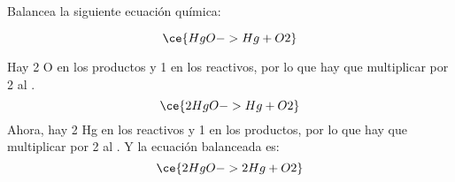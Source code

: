 Balancea la siguiente ecuación química:

\[\ce{HgO -> Hg + O2}\]

\begin{solutionbox}{4.5cm}
    Hay 2 O en los productos y 1 en los reactivos, por lo que hay que multiplicar por 2 al .
    \[ \ce{2HgO -> Hg + O2}\]
    Ahora, hay 2 Hg en los reactivos y 1 en los productos, por lo que hay que multiplicar por 2 al . Y la ecuación balanceada es:
    \[ \ce{2HgO -> 2Hg + O2}\]
\end{solutionbox}